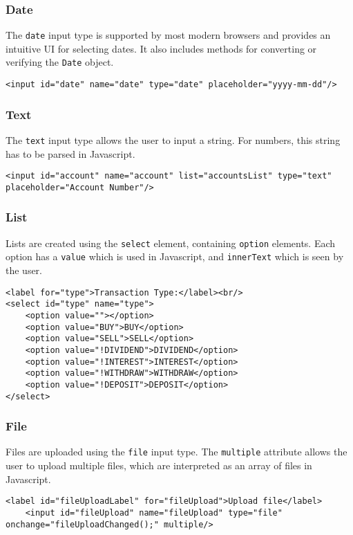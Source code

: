 \documentclass[letterpaper]{article}
\begin{document}
\subsubsection{Date}

The \lstinline{date} input type is supported by most modern browsers and provides an intuitive UI for selecting dates.
It also includes methods for converting or verifying the \lstinline{Date} object.
\begin{lstlisting}[firstnumber=13]
<input id="date" name="date" type="date" placeholder="yyyy-mm-dd"/>
\end{lstlisting}

\subsubsection{Text}

The \lstinline{text} input type allows the user to input a string. For numbers, this string has to be parsed in Javascript.
\begin{lstlisting}[firstnumber=28]
<input id="account" name="account" list="accountsList" type="text" placeholder="Account Number"/>
\end{lstlisting}

\subsubsection{List}

Lists are created using the \lstinline{select} element, containing \lstinline{option} elements.
Each option has a \lstinline{value} which is used in Javascript, and \lstinline{innerText} which is seen by the user.
\begin{lstlisting}[firstnumber=34]
<label for="type">Transaction Type:</label><br/>
<select id="type" name="type">
    <option value=""></option>
    <option value="BUY">BUY</option>
    <option value="SELL">SELL</option>
    <option value="!DIVIDEND">DIVIDEND</option>
    <option value="!INTEREST">INTEREST</option>
    <option value="!WITHDRAW">WITHDRAW</option>
    <option value="!DEPOSIT">DEPOSIT</option>
</select>
\end{lstlisting}

\subsubsection{File}

Files are uploaded using the \lstinline{file} input type.
The \lstinline{multiple} attribute allows the user to upload multiple files, which are interpreted as an array of files in Javascript.
\begin{lstlisting}[firstnumber=64]
    <label id="fileUploadLabel" for="fileUpload">Upload file</label>
    <input id="fileUpload" name="fileUpload" type="file" onchange="fileUploadChanged();" multiple/>
\end{lstlisting}
\end{document}
